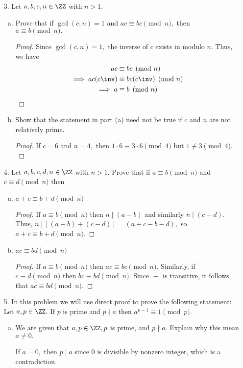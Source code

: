 \documentclass{article}
\begin{document}
\begin{itemize}
	\item[3.] Let $a, b, c, n\in\ZZ$ with $n>1.$
		\begin{enumerate}[(a)]
			\item Prove that if $\gcd(c, n)=1$ and $ac\equiv bc\pmod n,$ then $a\equiv b\pmod n.$
				\begin{proof}
					Since $\gcd(c, n)=1,$ the inverse of $c$ exists in modulo $n.$ Thus, we have
					\begin{align*}
						ac &\equiv bc \pmod n \\
						\implies ac(c\inv) &\equiv bc(c\inv) \pmod n \\
						\implies a &\equiv b \pmod n
					\end{align*}
				\end{proof}

			\item Show that the statement in part (a) need not be true if $c$ and $n$ are not relatively prime.
				\begin{proof}
					If $c=6$ and $n=4,$ then $1\cdot 6 \equiv 3\cdot 6\pmod 4$ but $1\not\equiv 3\pmod 4.$
				\end{proof}
				
		\end{enumerate}

		\newpage
	\item[4.] Let $a, b, c, d, n\in \ZZ$ with $n>1.$ Prove that if $a\equiv b\pmod n$ and $c\equiv d\pmod n$ then
		\begin{enumerate}[(a)]
			\item $a+c\equiv b+d\pmod n$
				\begin{proof}
					If $a\equiv b\pmod n$ then $n\mid (a-b)$ and similarly $n\mid (c-d).$ Thus, $n\mid \left[ (a-b)+(c-d) \right] = (a+c-b-d),$ so $a+c\equiv b+d\pmod n.$
				\end{proof}

			\item $ac\equiv bd\pmod n$
				\begin{proof}
					If $a\equiv b\pmod n$ then $ac\equiv bc\pmod n.$ Similarly, if $c\equiv d\pmod n$ then $bc\equiv bd\pmod n.$ Since $\equiv$ is transitive, it follows that $ac\equiv bd\pmod n.$
				\end{proof}
				
		\end{enumerate}

	\item[5.] In this problem we will use direct proof to prove the following statement: Let $a, p\in\ZZ.$ If $p$ is prime and $p\nmid a$ then $a^{p-1}\equiv1\pmod p.$
		\begin{enumerate}[(a)]
			\item We are given that $a, p\in\ZZ, p$ is prime, and $p\nmid a.$ Explain why this mean $a\neq 0.$
				\begin{answer*}
					If $a=0,$ then $p\mid a$ since 0 is divisible by nonzero integer, which is a contradiction.
				\end{answer*}


\end{enumerate}
\end{itemize}
\end{document}
